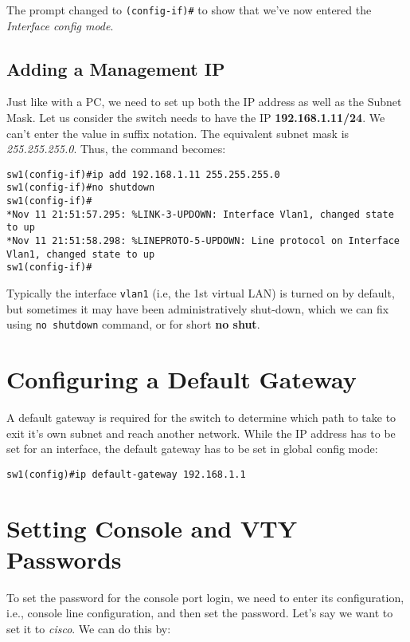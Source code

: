 \noindent
The prompt changed to \verb|(config-if)#| to show that we've now entered the \textit{Interface config mode}.

\subsection{Adding a Management IP}
Just like with a PC, we need to set up both the IP address as well as the Subnet Mask. Let us consider the switch needs to have the IP \textbf{192.168.1.11/24}. We can't enter the value in suffix notation. The equivalent subnet mask is \textit{255.255.255.0}. Thus, the command becomes:

\vspace{-15pt}
\begin{verbatim}
sw1(config-if)#ip add 192.168.1.11 255.255.255.0
sw1(config-if)#no shutdown
sw1(config-if)#
*Nov 11 21:51:57.295: %LINK-3-UPDOWN: Interface Vlan1, changed state to up
*Nov 11 21:51:58.298: %LINEPROTO-5-UPDOWN: Line protocol on Interface Vlan1, changed state to up
sw1(config-if)#
\end{verbatim}
\vspace{-10pt}

\noindent
Typically the interface \verb|vlan1| (i.e, the 1st virtual LAN) is turned on by default, but sometimes it may have been administratively shut-down, which we can fix using \verb|no shutdown| command, or for short \textbf{no shut}.

\section{Configuring a Default Gateway}
A default gateway is required for the switch to determine which path to take to exit it's own subnet and reach another network. While the IP address has to be set for an interface, the default gateway has to be set in global config mode:

\vspace{-15pt}
\begin{verbatim}
sw1(config)#ip default-gateway 192.168.1.1
\end{verbatim}
\vspace{-10pt}

\section{Setting Console and VTY Passwords}
To set the password for the console port login, we need to enter its configuration, i.e., console line configuration, and then set the password. Let's say we want to set it to \textit{cisco}. We can do this by:

